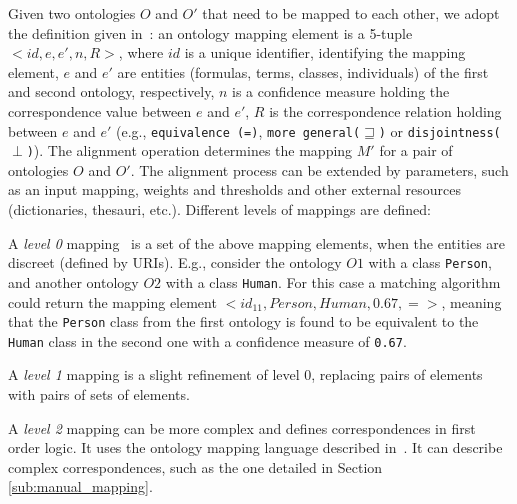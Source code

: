 Given two ontologies $O$ and $O'$ that need to be mapped to each other, we adopt the definition given in~\cite{shvaiko2005schema_based}: an ontology mapping element is a 5-tuple $<id, e, e', n, R>$, where 
$id$ is a unique identifier, identifying the
mapping element, 
$e$ and $e'$ are entities (formulas, terms, classes, individuals) of the first and second ontology, respectively, 
$n$ is a confidence measure holding the correspondence value between $e$ and
$e'$, 
$R$ is the correspondence relation holding between $e$ and $e'$ (e.g., \texttt{equivalence (=)}, \texttt{more general($\sqsupseteq$)} or \texttt{disjointness($\perp$)}).
The alignment operation determines the mapping $M'$ for a pair of ontologies $O$ and $O'$. The alignment process can be extended by parameters, such as an input mapping, weights and thresholds and other external resources (dictionaries, thesauri, etc.). Different levels of mappings are defined:

\begin{inparaenum}[(a)]
    \item A \textit{level 0} mapping~\cite{euzenat2004api} is a set of the above mapping elements, when the entities are discreet (defined by URIs). E.g., consider the ontology $O1$ with a class \texttt{Person}, and another ontology $O2$ with a class \texttt{Human}. For this case a matching algorithm  could return the mapping element $< id_{11}, Person, Human, 0.67, = >$, meaning that the \texttt{Person} class from the first ontology is found to be equivalent to the \texttt{Human} class in the second one with a confidence measure of \texttt{0.67}.
    \item A \textit{level 1} mapping is a slight refinement of level 0, replacing pairs of elements with pairs of sets of elements.
    \item A \textit{level 2} mapping can be more complex and defines correspondences in first order logic. It uses the ontology mapping language described in~\cite{scharffe2005language}. It can describe complex correspondences, such as the one detailed in Section \ref{sub:manual_mapping}.
\end{inparaenum}
% 
 

